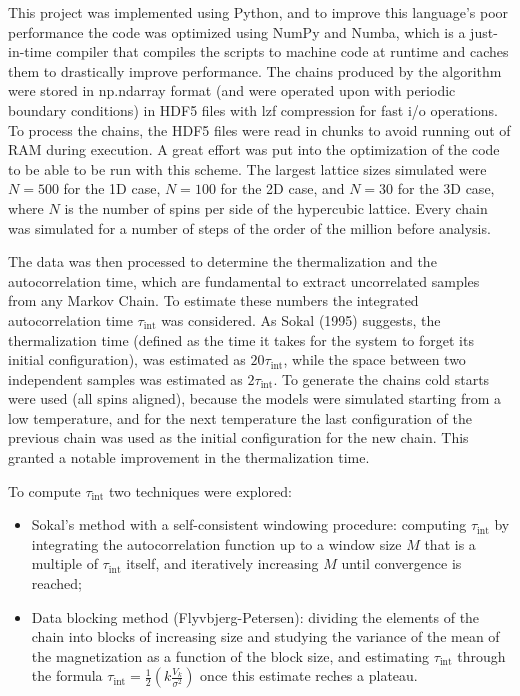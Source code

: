 \documentclass[11pt,a4paper]{article}
\begin{document}
This project was implemented using Python, and to improve this language's poor performance the code was optimized using NumPy and Numba, which is a just-in-time compiler that compiles the scripts to machine code at runtime and caches them to drastically improve performance. The chains produced by the algorithm were stored in np.ndarray format (and were operated upon with periodic boundary conditions) in HDF5 files with lzf compression for fast i/o operations. To process the chains, the HDF5 files were read in chunks to avoid running out of RAM during execution. A great effort was put into the optimization of the code to be able to be run with this scheme. The largest lattice sizes simulated were $N = 500$ for the 1D case, $N = 100$ for the 2D case, and $N = 30$ for the 3D case, where $N$ is the number of spins per side of the hypercubic lattice. Every chain was simulated for a number of steps of the order of the million before analysis.

The data was then processed to determine the thermalization and the autocorrelation time, which are fundamental to extract uncorrelated samples from any Markov Chain. To estimate these numbers the integrated autocorrelation time $\tau_{\text{int}}$ was considered. As Sokal (1995) suggests, the thermalization time (defined as the time it takes for the system to forget its initial configuration), was estimated as $20 \tau_{\text{int}}$, while the space between two independent samples was estimated as $2 \tau_{\text{int}}$. To generate the chains cold starts were used (all spins aligned), because the models were simulated starting from a low temperature, and for the next temperature the last configuration of the previous chain was used as the initial configuration for the new chain. This granted a notable improvement in the thermalization time.

To compute $\tau_{\text{int}}$ two techniques were explored:

\begin{itemize}[leftmargin=*,itemsep=0.25em]
	\item Sokal's method with a self-consistent windowing procedure: computing $\tau_{\text{int}}$ by integrating the autocorrelation function up to a window size $M$ that is a multiple of $\tau_{\text{int}}$ itself, and iteratively increasing $M$ until convergence is reached;
	\item Data blocking method (Flyvbjerg-Petersen): dividing the elements of the chain into blocks of increasing size and studying the variance of the mean of the magnetization as a function of the block size, and estimating $\tau_{\text{int}}$ through the formula $\tau_{\text{int}} = \frac{1}{2} \left( k \frac{V_k}{\sigma^2}\right)$ once this estimate reches a plateau.
\end{itemize}
\end{document}

